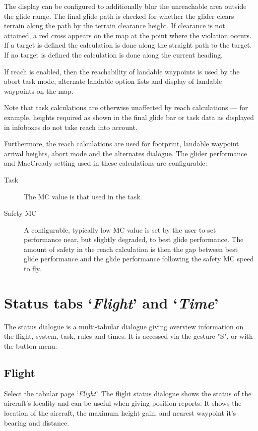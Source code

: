 The display can be configured to additionally blur the unreachable area
outside the glide range. 
The final glide path is checked for whether the glider clears terrain along
the path by the terrain clearance height.  If clearance is not attained, a red
cross appears on the map at the point where the violation occurs. If a target is
defined the calculation is done along the straight path to the target. If no
target is defined the calculation is done along the current heading.

If reach is enabled, then the reachability of landable waypoints is used
by the abort task mode, alternate landable option lists and display of
landable waypoints on the map.

Note that task calculations are otherwise unaffected by reach
calculations --- for example, heights required as shown in the final
glide bar or task data as displayed in infoboxes do not take reach into account.

Furthermore, the reach calculations are used for footprint, landable
waypoint arrival heights, abort mode and the alternates dialogue.  The glider
performance and MacCready setting used in these calculations are configurable:
\begin{description}
\item[Task] The MC value is that used in the task.
\item[Safety MC] A configurable, typically low MC value is set by the user to set
  performance near, but slightly degraded, to best glide performance. The amount of safety
  in the reach calculation is then the gap between best glide performance and the glide
  performance following the safety MC speed to fly.
\end{description}

\section{Status tabs `{\it Flight}' and `{\it Time}'}\label{sec:flight-status}

The status dialogue is a multi-tabular dialogue giving overview information on the
flight, system, task, rules and times.
It is accessed via the gesture "S", or with the button menu.
\begin{quote}
\blink{}
\end{quote}

\subsection*{Flight}
Select the tabular page `{\it Flight}'.
The flight status dialogue shows the status of the aircraft's locality and can
be useful when giving position reports. It shows the location of the aircraft, the
maximum height gain, and nearest waypoint it's bearing and distance.


